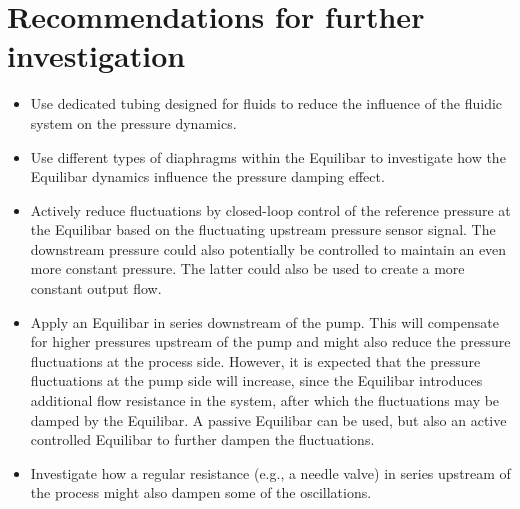 \documentclass[12pt,a4paper]{article}
\begin{document}
\newpage

\section{Recommendations for further investigation}
\begin{itemize}
    \item Use dedicated tubing designed for fluids to reduce the influence of the fluidic system on the pressure dynamics.
    \item Use different types of diaphragms within the Equilibar to investigate how the Equilibar dynamics influence the pressure damping effect.
    \item Actively reduce fluctuations by closed-loop control of the reference pressure at the Equilibar based on the fluctuating upstream pressure sensor signal. The downstream pressure could also potentially be controlled to maintain an even more constant pressure. The latter could also be used to create a more constant output flow.
    \item Apply an Equilibar in series downstream of the pump. This will compensate for higher pressures upstream of the pump and might also reduce the pressure fluctuations at the process side. However, it is expected that the pressure fluctuations at the pump side will increase, since the Equilibar introduces additional flow resistance in the system, after which the fluctuations may be damped by the Equilibar. A passive Equilibar can be used, but also an active controlled Equilibar to further dampen the fluctuations.
    \item Investigate how a regular resistance (e.g., a needle valve) in series upstream of the process might also dampen some of the oscillations.
\end{itemize}



\end{document}
